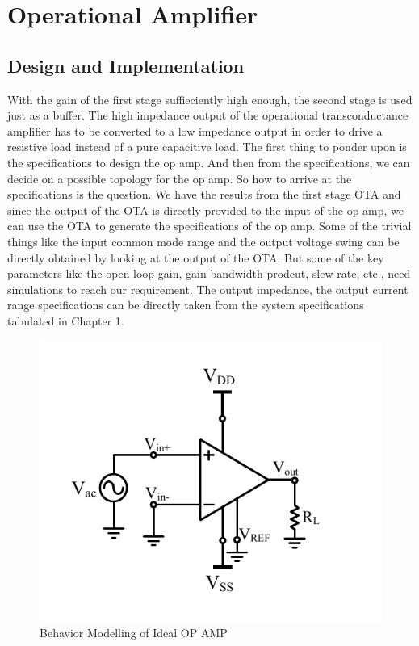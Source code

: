 \chapter{Operational Amplifier}

\section{Design and Implementation}
With the gain of the first stage suffieciently high enough, the second stage is used just as a buffer. The high impedance output of the operational transconductance amplifier has to be converted to a low impedance output in order to drive a resistive load instead of a pure capacitive load. The first thing to ponder upon is the specifications to design the op amp. And then from the specifications, we can decide on a possible topology for the op amp. So how to arrive at the specifications is the question. We have the results from the first stage OTA and since the output of the OTA is directly provided to the input of the op amp, we can use the OTA to generate the specifications of the op amp. Some of the trivial things like the input common mode range and the output voltage swing can be directly obtained by looking at the output of the OTA. But some of the key parameters like the open loop gain, gain bandwidth prodcut, slew rate, etc., need simulations to reach our requirement. The output impedance, the output current range specifications can be directly taken from the system specifications tabulated in Chapter 1.

\begin{figure} [H]
\centering
\includegraphics[scale=1]{Figures/System_Level/ahdl_OPAMP.pdf}
\caption{Behavior Modelling of Ideal OP AMP}
\label{fig:ahdlopamp}
\end{figure}

